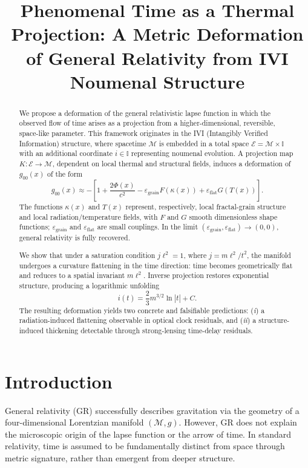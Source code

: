 \documentclass[11pt]{article}
\title{\textbf{Phenomenal Time as a Thermal Projection: A Metric Deformation of General Relativity from IVI Noumenal Structure}}
\author{ }
\date{ }
\begin{document}
\maketitle

\begin{abstract}
We propose a deformation of the general relativistic lapse function in which the observed flow of time arises as a projection from a higher-dimensional, reversible, space-like parameter. This framework originates in the IVI (Intangibly Verified Information) structure, where spacetime $\mathcal{M}$ is embedded in a total space $\mathcal{E}=\mathcal{M}\times\mathbb{I}$ with an additional coordinate $i\in\mathbb{I}$ representing noumenal evolution. A projection map $K:\mathcal{E}\to\mathcal{M}$, dependent on local thermal and structural fields, induces a deformation of $g_{00}(x)$ of the form
\[
 g_{00}(x)\approx -\left[1+\frac{2\Phi(x)}{c^2}-\varepsilon_{\mathrm{grain}}F(\kappa(x))+\varepsilon_{\mathrm{flat}}G(T(x))\right].
\]
The functions $\kappa(x)$ and $T(x)$ represent, respectively, local fractal-grain structure and local radiation/temperature fields, with $F$ and $G$ smooth dimensionless shape functions; $\varepsilon_{\mathrm{grain}}$ and $\varepsilon_{\mathrm{flat}}$ are small couplings. In the limit $(\varepsilon_{\mathrm{grain}},\varepsilon_{\mathrm{flat}})\to(0,0)$, general relativity is fully recovered.

We show that under a saturation condition $j\ell^{2}=1$, where $j=m\ell^{2}/t^{2}$, the manifold undergoes a curvature flattening in the time direction: time becomes geometrically flat and reduces to a spatial invariant $m\ell^{2}$. Inverse projection restores exponential structure, producing a logarithmic unfolding
\[
 i(t)=\frac{2}{3}m^{3/2}\ln|t|+C.
\]
The resulting deformation yields two concrete and falsifiable predictions: (\emph{i}) a radiation-induced flattening observable in optical clock residuals, and (\emph{ii}) a structure-induced thickening detectable through strong-lensing time-delay residuals.
\end{abstract}

\section{Introduction}

General relativity (GR) successfully describes gravitation via the geometry of a four-dimensional Lorentzian manifold $(\mathcal{M},g)$. However, GR does not explain the microscopic origin of the lapse function or the arrow of time. In standard relativity, time is assumed to be fundamentally distinct from space through metric signature, rather than emergent from deeper structure.
\end{document}
